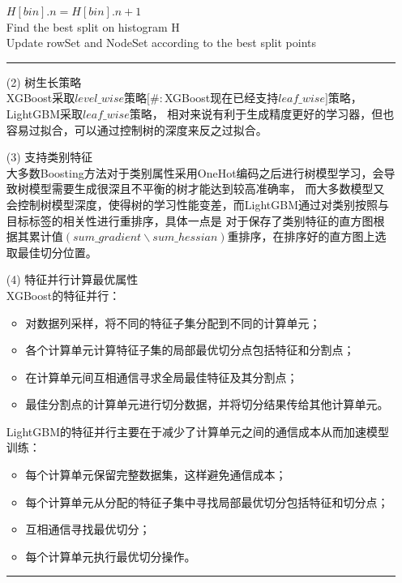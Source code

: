 \documentclass[a4paper]{article}
\begin{document}
\begin{itemize}
					\hspace*{96pt}  $H[bin].n = H[bin].n + 1$\\
					\hspace*{80pt}  Find the best split on histogram H\\
					\hspace*{48pt}  Update rowSet and NodeSet according to the best split points\\
				\noindent\rule[0.10\baselineskip]{\textwidth}{0.75pt}
			\item[(2)] 树生长策略\\
				XGBoost采取$level\_wise$策略$[\#:$XGBoost现在已经支持$leaf\_wise]$策略，LightGBM采取$leaf\_wise策略$，
				相对来说有利于生成精度更好的学习器，但也容易过拟合，可以通过控制树的深度来反之过拟合。
			\item[(3)] 支持类别特征\\
				大多数Boosting方法对于类别属性采用OneHot编码之后进行树模型学习，会导致树模型需要生成很深且不平衡的树才能达到较高准确率，
				而大多数模型又会控制树模型深度，使得树的学习性能变差，而LightGBM通过对类别按照与目标标签的相关性进行重排序，具体一点是
				对于保存了类别特征的直方图根据其累计值$(sum\_gradient\backslash sum\_hessian)$重排序，在排序好的直方图上选取最佳切分位置。
			\item[(4)] 特征并行计算最优属性\\
				XGBoost的特征并行：
				\begin{itemize}
					\item 对数据列采样，将不同的特征子集分配到不同的计算单元；
					\item 各个计算单元计算特征子集的局部最优切分点包括特征和分割点；
					\item 在计算单元间互相通信寻求全局最佳特征及其分割点；
					\item 最佳分割点的计算单元进行切分数据，并将切分结果传给其他计算单元。
				\end{itemize}
				LightGBM的特征并行主要在于减少了计算单元之间的通信成本从而加速模型训练：
				\begin{itemize}
					\item 每个计算单元保留完整数据集，这样避免通信成本；
					\item 每个计算单元从分配的特征子集中寻找局部最优切分包括特征和切分点；
					\item 互相通信寻找最优切分；
					\item 每个计算单元执行最优切分操作。
				\end{itemize}
			\noindent\rule[0.10\baselineskip]{\textwidth}{0.75pt}\\

\end{itemize}
\end{document}
